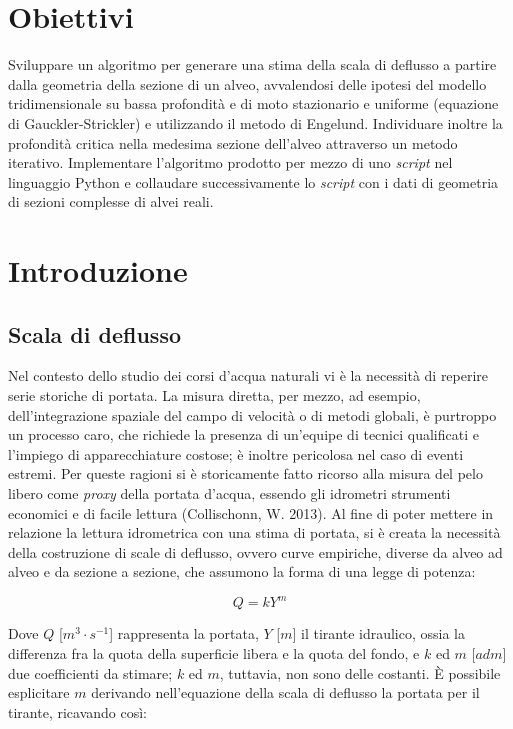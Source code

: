 \documentclass[12pt]{article} %
\begin{document}
\newpage
\thispagestyle{empty}
\tableofcontents
\newpage
\listoffigures
\newpage

\section{Obiettivi}
\noindent Sviluppare un algoritmo per generare una stima della scala di deflusso a partire dalla geometria della sezione di un alveo, avvalendosi delle ipotesi del modello tridimensionale su bassa profondità e di moto stazionario e uniforme (equazione di Gauckler-Strickler) e utilizzando il metodo di Engelund. Individuare inoltre la profondità critica nella medesima sezione dell’alveo attraverso un metodo iterativo. Implementare l’algoritmo prodotto per mezzo di uno \textit{script} nel linguaggio Python e collaudare successivamente lo \textit{script} con i dati di geometria di sezioni complesse di alvei reali.

\newpage
\section{Introduzione}
\subsection{Scala di deflusso}
\noindent Nel contesto dello studio dei corsi d’acqua naturali vi è la necessità di reperire serie storiche di portata. La misura diretta, per mezzo, ad esempio, dell’integrazione spaziale del campo di velocità o di metodi globali, è purtroppo un processo caro, che richiede la presenza di un’equipe di tecnici qualificati e l’impiego di apparecchiature costose; è inoltre pericolosa nel caso di eventi estremi. 
Per queste ragioni si è storicamente fatto ricorso alla misura del pelo libero come \textit{proxy} della portata d’acqua, essendo gli idrometri strumenti economici e di facile lettura (Collischonn, W. 2013).
Al fine di poter mettere in relazione la lettura idrometrica con una stima di portata, si è creata la necessità della costruzione di scale di deflusso, ovvero curve empiriche, diverse da alveo ad alveo e da sezione a sezione, che assumono la forma di una legge di potenza: 

\begin{equation}
    Q=kY^m
    \label{eqn:scala_deflusso}
\end{equation}

\noindent Dove $Q$ [$m^3\cdot s^{-1}$]  rappresenta la portata, $Y$ [$m$] il tirante idraulico, ossia la differenza fra la quota della superficie libera e la quota del fondo, e $k$ ed $m$ [$adm]$ due coefficienti da stimare; $k$ ed $m$, tuttavia, non sono delle costanti. È possibile esplicitare $m$ derivando nell’equazione della scala di deflusso la portata per il tirante, ricavando così: 
\end{document}

